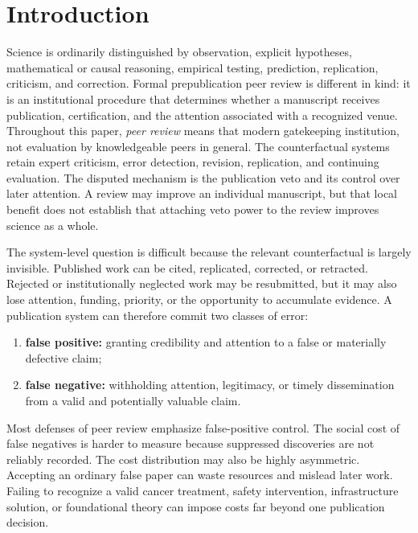 \documentclass[11pt]{article}
\begin{document}
\section{Introduction}

Science is ordinarily distinguished by observation, explicit hypotheses, mathematical or causal reasoning, empirical testing, prediction, replication, criticism, and correction. Formal prepublication peer review is different in kind: it is an institutional procedure that determines whether a manuscript receives publication, certification, and the attention associated with a recognized venue. Throughout this paper, \emph{peer review} means that modern gatekeeping institution, not evaluation by knowledgeable peers in general. The counterfactual systems retain expert criticism, error detection, revision, replication, and continuing evaluation. The disputed mechanism is the publication veto and its control over later attention. A review may improve an individual manuscript, but that local benefit does not establish that attaching veto power to the review improves science as a whole.

The system-level question is difficult because the relevant counterfactual is largely invisible. Published work can be cited, replicated, corrected, or retracted. Rejected or institutionally neglected work may be resubmitted, but it may also lose attention, funding, priority, or the opportunity to accumulate evidence. A publication system can therefore commit two classes of error:

\begin{enumerate}[label=(\roman*)]
    \item \textbf{false positive:} granting credibility and attention to a false or materially defective claim;
    \item \textbf{false negative:} withholding attention, legitimacy, or timely dissemination from a valid and potentially valuable claim.
\end{enumerate}

Most defenses of peer review emphasize false-positive control. The social cost of false negatives is harder to measure because suppressed discoveries are not reliably recorded. The cost distribution may also be highly asymmetric. Accepting an ordinary false paper can waste resources and mislead later work. Failing to recognize a valid cancer treatment, safety intervention, infrastructure solution, or foundational theory can impose costs far beyond one publication decision.
\end{document}
